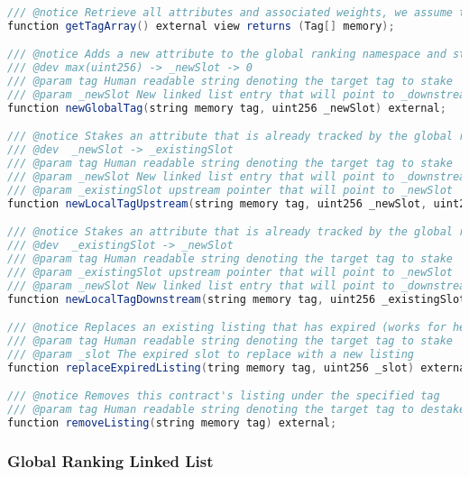 \begin{lstlisting}[language=Java, caption=A minimal interface for a content object.]
/// @notice Retrieve all attributes and associated weights, we assume the size of this array is small enough to return without pagination
function getTagArray() external view returns (Tag[] memory);

/// @notice Adds a new attribute to the global ranking namespace and stakes it for this content object
/// @dev max(uint256) -> _newSlot -> 0
/// @param tag Human readable string denoting the target tag to stake
/// @param _newSlot New linked list entry that will point to _downstream slot
function newGlobalTag(string memory tag, uint256 _newSlot) external;

/// @notice Stakes an attribute that is already tracked by the global ranking namespace but hasn't been staked by this content object yet
/// @dev  _newSlot -> _existingSlot
/// @param tag Human readable string denoting the target tag to stake
/// @param _newSlot New linked list entry that will point to _downstream slot
/// @param _existingSlot upstream pointer that will point to _newSlot
function newLocalTagUpstream(string memory tag, uint256 _newSlot, uint256 _existingSlot) external;

/// @notice Stakes an attribute that is already tracked by the global ranking namespace but hasn't been staked by this content object yet
/// @dev  _existingSlot -> _newSlot
/// @param tag Human readable string denoting the target tag to stake
/// @param _existingSlot upstream pointer that will point to _newSlot
/// @param _newSlot New linked list entry that will point to _downstream slot
function newLocalTagDownstream(string memory tag, uint256 _existingSlot, uint256 _newSlot) external;

/// @notice Replaces an existing listing that has expired (works for head and tail listings)
/// @param tag Human readable string denoting the target tag to stake
/// @param _slot The expired slot to replace with a new listing
function replaceExpiredListing(tring memory tag, uint256 _slot) external;

/// @notice Removes this contract's listing under the specified tag
/// @param tag Human readable string denoting the target tag to destake
function removeListing(string memory tag) external;
\end{lstlisting}

\subsubsection{Global Ranking Linked List}
\label{GlobalRankingInterface}

